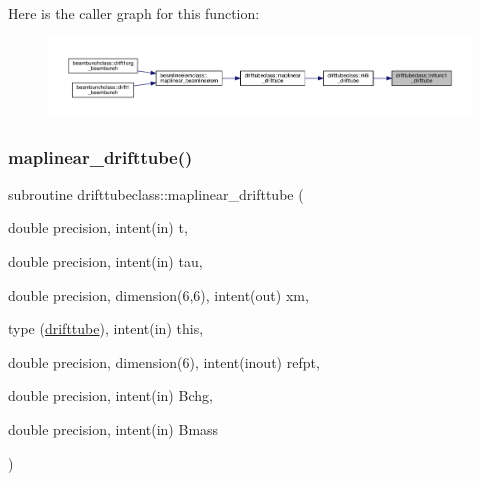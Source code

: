 Here is the caller graph for this function\+:\nopagebreak
\begin{figure}[H]
\begin{center}
\leavevmode
\includegraphics[width=350pt]{namespacedrifttubeclass_a053027aad7a9b20bafb34d676de9a14a_icgraph}
\end{center}
\end{figure}
\mbox{\label{namespacedrifttubeclass_aaf41c0aaec4dc3e16fc0f678b3220de3}} 
\subsubsection{\texorpdfstring{maplinear\_drifttube()}{maplinear\_drifttube()}}
{\footnotesize\ttfamily subroutine drifttubeclass\+::maplinear\+\_\+drifttube (\begin{DoxyParamCaption}\item[{double precision, intent(in)}]{t,  }\item[{double precision, intent(in)}]{tau,  }\item[{double precision, dimension(6,6), intent(out)}]{xm,  }\item[{type (\mbox{\hyperlink{namespacedrifttubeclass_structdrifttubeclass_1_1drifttube}{drifttube}}), intent(in)}]{this,  }\item[{double precision, dimension(6), intent(inout)}]{refpt,  }\item[{double precision, intent(in)}]{Bchg,  }\item[{double precision, intent(in)}]{Bmass }\end{DoxyParamCaption})}

